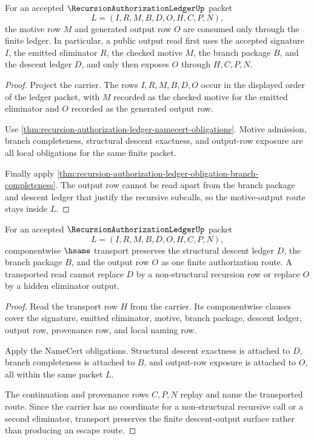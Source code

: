 \begin{theorem}
\label{thm:recursion-authorization-ledger-motive-output-route}
For an accepted $\RecursionAuthorizationLedgerUp$ packet
$$
L=(I,R,M,B,D,O,H,C,P,N),
$$
the motive row $M$ and generated output row $O$ are consumed only through the finite ledger. In particular, a public output read first uses the accepted signature $I$, the emitted eliminator $R$, the checked motive $M$, the branch package $B$, and the descent ledger $D$, and only then exposes $O$ through $H,C,P,N$.
\end{theorem}
\begin{proof}
Project the carrier. The rows $I,R,M,B,D,O$ occur in the displayed order of the ledger packet, with $M$ recorded as the checked motive for the emitted eliminator and $O$ recorded as the generated output row.

Use \autoref{thm:recursion-authorization-ledger-namecert-obligations}. Motive admission, branch completeness, structural descent exactness, and output-row exposure are all local obligations for the same finite packet.

Finally apply \autoref{thm:recursion-authorization-ledger-obligation-branch-completeness}. The output row cannot be read apart from the branch package and descent ledger that justify the recursive subcalls, so the motive-output route stays inside $L$.
\end{proof}

\begin{theorem}
\label{thm:recursion-authorization-ledger-descent-transport-stability}
For an accepted $\RecursionAuthorizationLedgerUp$ packet
$$
L=(I,R,M,B,D,O,H,C,P,N),
$$
componentwise $\hsame$ transport preserves the structural descent ledger $D$, the branch package $B$, and the output row $O$ as one finite authorization route. A transported read cannot replace $D$ by a non-structural recursion row or replace $O$ by a hidden eliminator output.
\end{theorem}
\begin{proof}
Read the transport row $H$ from the carrier. Its componentwise clauses cover the signature, emitted eliminator, motive, branch package, descent ledger, output row, provenance row, and local naming row.

Apply the NameCert obligations. Structural descent exactness is attached to $D$, branch completeness is attached to $B$, and output-row exposure is attached to $O$, all within the same packet $L$.

The continuation and provenance rows $C,P,N$ replay and name the transported route. Since the carrier has no coordinate for a non-structural recursive call or a second eliminator, transport preserves the finite descent-output surface rather than producing an escape route.
\end{proof}

